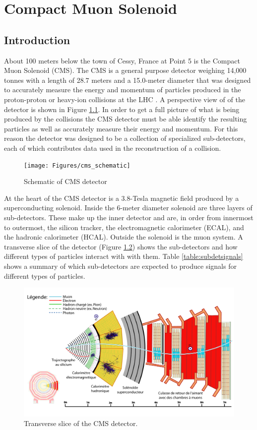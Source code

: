 \chapter{Compact Muon Solenoid}

\section{Introduction}
About 100 meters below the town of Cessy, France at Point 5 is the Compact Muon Solenoid (CMS).  The CMS is a general purpose detector weighing 14,000 tonnes with a length of 28.7 meters and a 15.0-meter diameter that was designed to accurately measure the energy and momentum of particles produced in the proton-proton or heavy-ion collisions at the LHC \cite{Collaboration_2008}.  A perspective view of of the detector is shown in Figure \ref{fig:cmsschematic}.  In order to get a full picture of what is being produced by the collisions the CMS detector must be able identify the resulting particles as well as accurately measure their energy and momentum.  For this reason the detector was designed to be a collection of specialized sub-detectors, each of which contributes data used in the reconstruction of a collision.  
\begin{figure}[h]
	\centering
	\texttt{[image: Figures/cms\_schematic]}
	\caption{Schematic of CMS detector \cite{Sakuma_2014}}
	\label{fig:cmsschematic}
\end{figure}

At the heart of the CMS detector is a 3.8-Tesla magnetic field produced by a superconducting solenoid.  Inside the 6-meter diameter solenoid are three layers of sub-detectors.  These make up the inner detector and are, in order from innermost to outermost, the silicon tracker, the electromagnetic calorimeter (ECAL), and the hadronic calorimeter (HCAL).  Outside the solenoid is the muon system.  A transverse slice of the detector (Figure \ref{fig:cmsslicewhitecolourfrench291016}) shows the sub-detectors and how different types of particles interact with with them.  Table \ref{table:subdetsignals} shows a summary of which sub-detectors are expected to produce signals for different types of particles. 

\begin{figure}[h]
	\centering
	\includegraphics[width=0.7\linewidth]{Figures/CMS_slice_white_colour_french_291016}
	\caption{Transverse slice of the CMS detector\cite{Barney:2628641}.}
	\label{fig:cmsslicewhitecolourfrench291016}
\end{figure}



